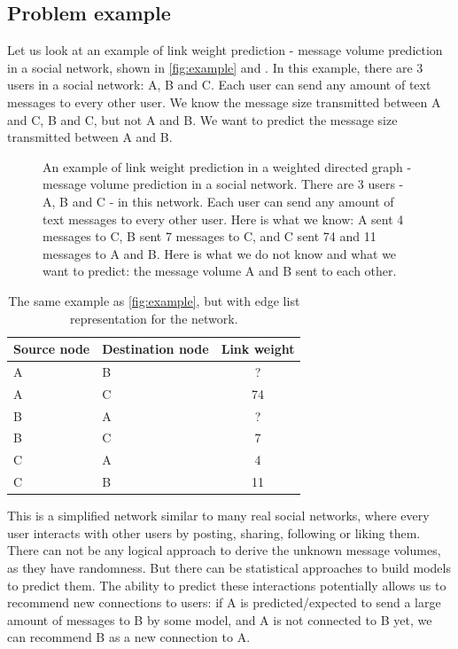 \documentclass[conference]{IEEEtran}
\begin{document}
\subsection{Problem example}
Let us look at an example of link weight prediction - message volume prediction in a social network, shown in \autoref{fig:example} and .
In this example, there are 3 users in a social network: A, B and C.
Each user can send any amount of text messages to every other user.
We know the message size transmitted between A and C, B and C, but not A and B.
We want to predict the message size transmitted between A and B.
\begin{figure}[!htb]\centering
	\caption{
		An example of link weight prediction in a weighted directed graph -
		message volume prediction in a social network.
		There are 3 users - A, B and C - in this network.
		Each user can send any amount of text messages to every other user.
		Here is what we know:
		A sent 4 messages to C,
		B sent 7 messages to C,
		and C sent 74 and 11 messages to A and B.
		Here is what we do not know and what we want to predict:
		the message volume A and B sent to each other.
		}
	\label{fig:example}
\end{figure}
\begin{table}[!htb]\centering
	\caption{
		The same example as \autoref{fig:example}, but with edge list representation for the network.
	}
	\begin{tabularx}{0.45\textwidth}{|X|X|c|}  \hline \rowcolor{blue!40}
		Source node & Destination node & Link weight \\ \hline
		A & B & ? \\ \hline
		A & C & 74 \\ \hline
		B & A & ? \\ \hline
		B & C & 7 \\ \hline
		C & A & 4 \\ \hline
		C & B & 11 \\ \hline
	\end{tabularx}
	\label{tab:example}
\end{table}
This is a simplified network similar to many real social networks, where every user interacts with other users by posting, sharing, following or liking them.
There can not be any logical approach to derive the unknown message volumes,
as they have randomness.
But there can be statistical approaches to build models to predict them.
The ability to predict these interactions potentially allows us to recommend new connections to users:
if A is predicted/expected to send a large amount of messages to B by some model,
and A is not connected to B yet,
we can recommend B as a new connection to A.
\end{document}
